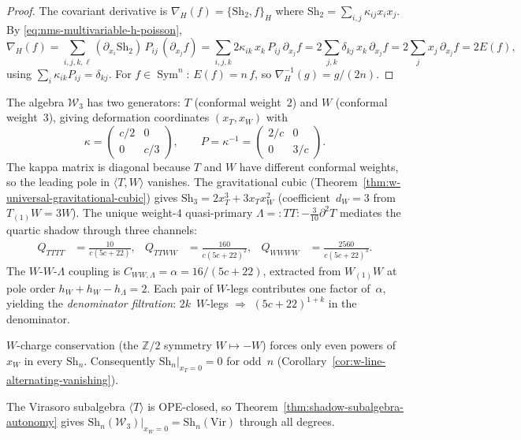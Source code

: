 \begin{proof}
The covariant derivative is $\nabla_H(f) = \{\mathrm{Sh}_2, f\}_H$
where $\mathrm{Sh}_2 = \sum_{i,j} \kappa_{ij} x_i x_j$. By
\eqref{eq:nms-multivariable-h-poisson},
\[
\nabla_H(f)
= \sum_{i,j,k,\ell}
 (\partial_{x_i} \mathrm{Sh}_2)\, P_{ij}\, (\partial_{x_j} f)
= \sum_{i,j,k}
 2\kappa_{ik}\,x_k\, P_{ij}\, \partial_{x_j} f
= 2 \sum_{j,k} \delta_{kj}\, x_k\, \partial_{x_j} f
= 2 \sum_j x_j\, \partial_{x_j} f
= 2E(f),
\]
using $\sum_i \kappa_{ik} P_{ij} = \delta_{kj}$. For
$f \in \operatorname{Sym}^n$: $E(f) = n\,f$, so
$\nabla_H^{-1}(g) = g/(2n)$.
\end{proof}

\begin{example}
\label{ex:nms-w3-multivariable-shadow}%
%
The algebra $\mathcal{W}_3$ has two generators: $T$ (conformal
weight~$2$) and $W$ (conformal weight~$3$), giving deformation
coordinates $(x_T, x_W)$ with
\[
\kappa
= \begin{pmatrix} c/2 & 0 \\ 0 & c/3 \end{pmatrix},
\qquad
P = \kappa^{-1}
= \begin{pmatrix} 2/c & 0 \\ 0 & 3/c \end{pmatrix}.
\]
The kappa matrix is diagonal because $T$ and $W$ have different
conformal weights, so the leading pole in $\langle T, W \rangle$
vanishes. The gravitational cubic
(Theorem~\ref{thm:w-universal-gravitational-cubic}) gives
$\mathrm{Sh}_3 = 2x_T^3 + 3x_T x_W^2$ (coefficient~$d_W = 3$ from
$T_{(1)}W = 3W$). The unique weight-$4$ quasi-primary
$\Lambda = {:}TT{:} - \tfrac{3}{10}\partial^2 T$ mediates the quartic
shadow through three channels:
\begin{align}\label{eq:nms-w3-quartic-channels}
Q_{TTTT} &= \frac{10}{c(5c+22)},
&
Q_{TTWW} &= \frac{160}{c(5c+22)^2},
&
Q_{WWWW} &= \frac{2560}{c(5c+22)^3}.
\end{align}
The $W$-$W$-$\Lambda$ coupling is
$C_{WW,\Lambda} = \alpha = 16/(5c+22)$, extracted from $W_{(1)}W$ at
pole order $h_W + h_W - h_\Lambda = 2$. Each pair of $W$-legs
contributes one factor of~$\alpha$, yielding the
\emph{denominator filtration}:
$2k$~$W$-legs $\Rightarrow$ $(5c+22)^{1+k}$ in the denominator.

$W$-charge conservation (the $\mathbb{Z}/2$ symmetry
$W \mapsto -W$) forces only even powers of~$x_W$ in every
$\mathrm{Sh}_n$. Consequently
$\mathrm{Sh}_n\big|_{x_T = 0} = 0$ for odd~$n$
(Corollary~\ref{cor:w-line-alternating-vanishing}).

The Virasoro subalgebra $\langle T \rangle$ is OPE-closed, so
Theorem~\ref{thm:shadow-subalgebra-autonomy} gives
$\mathrm{Sh}_n(\mathcal{W}_3)\big|_{x_W=0}
= \mathrm{Sh}_n(\mathrm{Vir})$ through all degrees.
\end{example}

